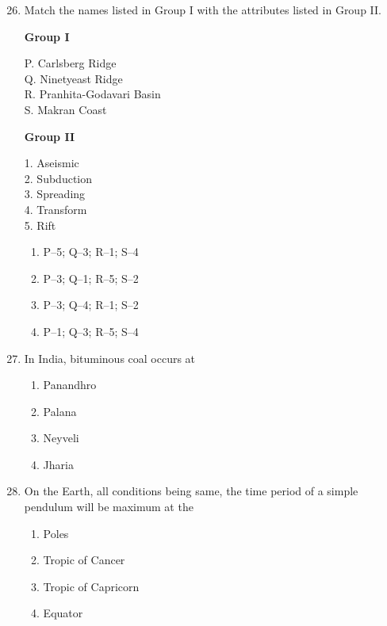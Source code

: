 \documentclass[journal,12pt,onecolumn]{IEEEtran}
\theoremstyle{remark}
\begin{document}
\begin{enumerate}
\setcounter{enumi}{25}

\item Match the names listed in Group I with the attributes listed in Group II.

\begin{multicols}{2}
\textbf{Group I}  
\begin{flushleft}
P. Carlsberg Ridge\\
Q. Ninetyeast Ridge\\
R. Pranhita-Godavari Basin\\
S. Makran Coast
\end{flushleft}

\columnbreak

\textbf{Group II}  
\begin{flushleft}
1. Aseismic\\
2. Subduction\\
3. Spreading\\
4. Transform\\
5. Rift
\end{flushleft}
\end{multicols}

\begin{multicols}{2}
\begin{enumerate}
\item P--5; Q--3; R--1; S--4  
\item P--3; Q--1; R--5; S--2  
\item P--3; Q--4; R--1; S--2  
\item P--1; Q--3; R--5; S--4  
\end{enumerate}
\end{multicols}

\item In India, bituminous coal occurs at  
\begin{multicols}{4}
\begin{enumerate}
\item Panandhro  
\item Palana  
\item Neyveli  
\item Jharia  
\end{enumerate}
\end{multicols}

\item On the Earth, all conditions being same, the time period of a simple pendulum will be maximum at the  
\begin{multicols}{2}
\begin{enumerate}
\item Poles  
\item Tropic of Cancer  
\item Tropic of Capricorn  
\item Equator  
\end{enumerate}
\end{multicols}


\end{enumerate}
\end{document}
